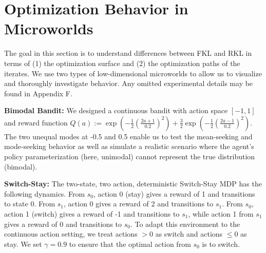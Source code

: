 \documentclass[twoside,11pt]{article}
\newcommand{\policyparams}{\theta}
\newcommand{\martha}[1]{{\color{blue} #1 }}
\begin{document}


\section{Optimization Behavior in Microworlds}

The goal in this section is to understand differences between FKL and RKL in terms of (1) the optimization surface and (2) the optimization paths of the iterates. We use two types of low-dimensional microworlds to allow us to visualize and thoroughly investigate behavior. Any omitted experimental details may be found in Appendix F. 


\textbf{Bimodal Bandit:} We designed a continuous bandit with action space $[-1, 1]$ and reward function $Q(a) := \exp( -\tfrac{1}{2} (\tfrac{2 a + 1}{0.2})^2 ) + \tfrac{3}{2} \exp(-\tfrac{1}{2} (\tfrac{2 a - 1}{0.2})^2)$. The two unequal modes at -0.5 and 0.5 enable us to test the mean-seeking and mode-seeking behavior as well as simulate a realistic scenario where the agent's policy parameterization (here, unimodal) cannot represent the true distribution (bimodal). 

\textbf{Switch-Stay:} The two-state, two action, deterministic Switch-Stay MDP has the following dynamics. From $s_0$, action $0$ (stay) gives a reward of 1 and transitions to state $0$. From $s_1$, action 0 gives a reward of 2 and transitions to $s_1$. From $s_0$, action 1 (switch) gives a reward of -1 and transitions to $s_1$, while action 1 from $s_1$ gives a reward of 0 and transitions to $s_0$. 
To adapt this environment to the continuous action setting, we treat actions $> 0$ as switch and actions $\leq 0$ as stay.  We set $\gamma = 0.9$ to ensure that the optimal action from $s_0$ is to switch. 
\end{document}
